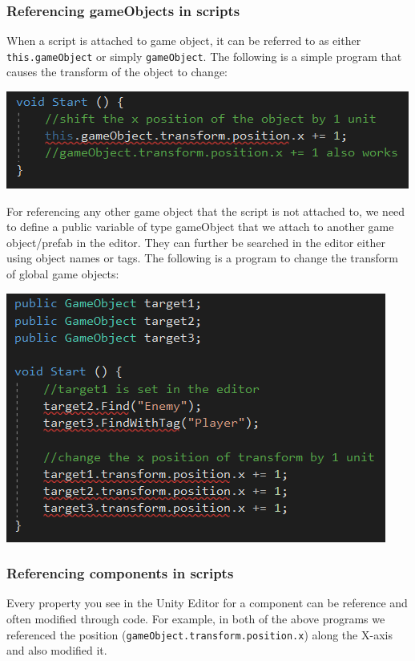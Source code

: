\documentclass{article}[a4paper,12pt]
\theoremstyle{definition}
\begin{document}
\subsubsection{Referencing gameObjects in scripts}
When a script is attached to game object, it can be referred to as either \texttt{this.gameObject} or simply \texttt{gameObject}. The following is a simple program that causes the transform of the object to change: 
\begin{center}\includegraphics{reference_local_gameobject.png}\end{center}
For referencing any other game object that the script is not attached to, we need to define a public variable of type gameObject that we attach to another game object/prefab in the editor. They can further be searched in the editor either using object names or tags. The following is a program to change the transform of global game objects:
\begin{center}\includegraphics{reference_global_gameobject.png}\end{center}

\subsubsection{Referencing components in scripts}
Every property you see in the Unity Editor for a component can be reference and often modified through code. For example, in both of the above programs we referenced the position (\texttt{gameObject.transform.position.x}) along the X-axis and also modified it.
\vspace{6pt}
\end{document}
